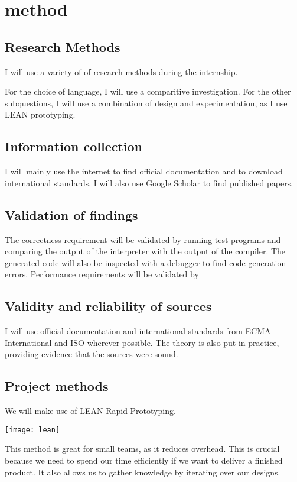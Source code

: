 \section{method}
\subsection{Research Methods}
I will use a variety of of research methods during the internship.

For the choice of language, I will use a comparitive investigation.
For the other subquestions, I will use a combination of design and experimentation, as I use LEAN prototyping.

\subsection{Information collection}
I will mainly use the internet to find official documentation and to download international standards.
I will also use Google Scholar to find published papers.

\subsection{Validation of findings}
The correctness requirement will be validated by running test programs and comparing the output of the interpreter with the output of the compiler.
The generated code will also be inspected with a debugger to find code generation errors.
Performance requirements will be validated by

\subsection{Validity and reliability of sources}
I will use official documentation and international standards from ECMA International and ISO wherever possible.
The theory is also put in practice, providing evidence that the sources were sound.

\subsection{Project methods}
We will make use of LEAN Rapid Prototyping\cite{lean}.

\texttt{[image: lean]}

This method is great for small teams, as it reduces overhead.
This is crucial because we need to spend our time efficiently if we want to deliver a finished product.
It also allows us to gather knowledge by iterating over our designs.


